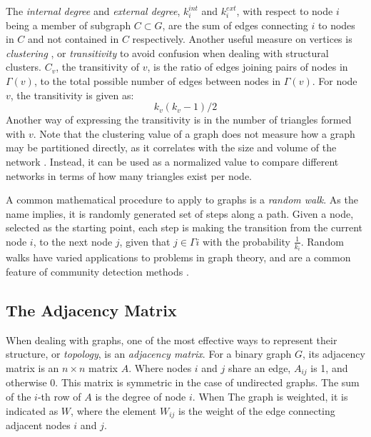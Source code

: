 The \textit{internal degree} and \textit{external degree}, $k^{int}_i$ and $k^{ext}_i$, with respect to node $i$ being a member of subgraph $C\subset G$, are the sum of edges connecting $i$ to nodes in $C$ and not contained in $C$ respectively. 
Another useful measure on vertices is \textit{clustering} \cite{Watts1998}, or \textit{transitivity} to avoid confusion when dealing with structural clusters. $C_v$, the transitivity of $v$, is the ratio of edges joining pairs of nodes in $\Gamma(v)$, to the total possible number of edges between nodes in $\Gamma(v)$. For node $v$, the transitivity is given as: $$k_v(k_v-1)/2$$ Another way of expressing the transitivity is in the number of triangles formed with $v$. Note that the clustering value of a graph does not measure how a graph may be partitioned directly, as it correlates with the size and volume of the network \cite{Kunegis2013}. Instead, it can be used as a normalized value to compare different networks in terms of how many triangles exist per node.

A common mathematical procedure to apply to graphs is a \textit{random walk}. As the name implies, it is  randomly generated set of steps along a path. Given a node, selected as the starting point, each step is making the transition from the current node $i$, to the next node $j$, given that $j\in\Gamma{i}$ with the probability $\frac{1}{k_i}$. Random walks have varied applications to problems in graph theory, and are a common feature of community detection methods \cite{Pons2006}.


\subsection{The Adjacency Matrix}
When dealing with graphs, one of the most effective ways to represent their structure, or \textit{topology}, is an \textit{adjacency matrix}. For a binary graph $G$, its adjacency matrix is an $n\times n$ matrix $A$. Where nodes $i$ and $j$ share an edge, $A_{ij}$ is 1, and otherwise 0. This matrix is symmetric in the case of undirected graphs. The sum of the $i$-th row of $A$ is the degree of node $i$.
When The graph is weighted, it is indicated as $W$, where the element $W_{ij}$ is the weight of the edge connecting adjacent nodes $i$ and $j$.


